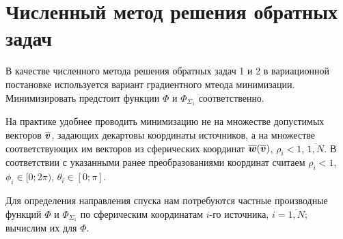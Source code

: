 \section{Численный метод решения обратных задач}

В качестве численного метода решения обратных задач 1 и 2 в вариационной постановке используется вариант градиентного мтеода минимизации. Минимизировать предстоит функции $\Phi$ и $\Phi_{\Sigma_1}$ соответственно.

На практике удобнее проводить минимизацию не на множестве допустимых векторов $\boldsymbol{\overline{v}}$, задающих декартовы координаты источников, а на множестве соответствующих им векторов из сферических координат $\boldsymbol{\overline{w}}(\boldsymbol{\overline{v}})$, $\rho_i < 1$, $\overline{1,N}$. В соответствии с указанными ранее преобразованиями координат считаем $\rho_i < 1$, $\phi_i \in [0; 2\pi)$, $\theta_i \in [0; \pi]$.

Для определения направления спуска нам потребуются частные производные функций $\Phi$ и $\Phi_{\Sigma_1}$ по сферическим координатам $i$-го источника, $i = \overline{1,N}$; вычислим их для $\Phi$.

